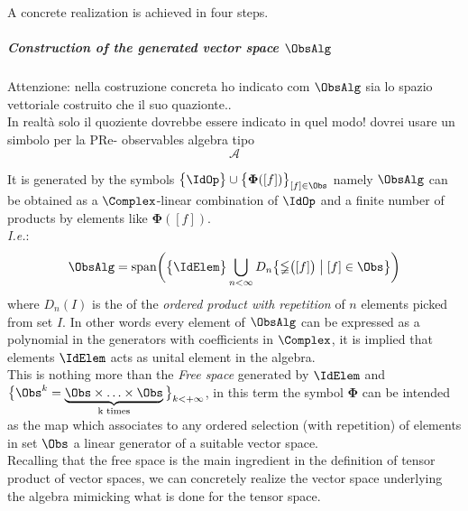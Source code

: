 \documentclass[Main]{subfiles}
\begin{document}
		A concrete realization is achieved in four steps.
			\subparagraph{Construction of the generated vector space $\ObsAlg$}
\ifToninus
		\begin{Warning}
			Attenzione: nella costruzione concreta ho indicato com $\ObsAlg$ sia lo spazio vettoriale costruito che il suo quazionte..
			\\
			In realtà solo il quoziente dovrebbe essere indicato in quel modo! dovrei usare un simbolo per la PRe- observables algebra tipo
			\begin{displaymath}
				\mathcal{A}
			\end{displaymath}
		\end{Warning}

\fi

   				It is generated
   				by the symbols $\big\{\IdOp\big\}\cup\big\{\mathbf{\Phi}([f])\big\}_{[f]\in \Obs}$ %
   				namely $\ObsAlg$ can be obtained as a $\Complex$-linear combination of $\IdOp$ and a finite number of products by elements like $\mathbf{\Phi}([f])$.\\
   				\textit{I.e.}:
   				\begin{displaymath}
   					\ObsAlg = \textrm{span} \biggr( \big\{\IdElem\big\}\bigcup_{n<\infty}D_n
   					\big\{\mathbb{\Phi}\big( [f]\big) \; \big\vert \;  [f] \in \Obs \big\}
   					\biggr)
   				\end{displaymath}
				where $D_n (I)$ is the of the \emph{ordered product with repetition}  of $n$ elements picked from set $I$.
   				In other words every element of $\ObsAlg$ can be expressed as a polynomial in the generators with coefficients in $\Complex$, it is implied that elements $\IdElem$ acts as unital element in the algebra.
   				\\
				This is nothing more than the \emph{Free space} generated by $\IdElem$ and $\big\{\Obs^k =
   				\underbrace{\Obs\times \ldots \times \Obs}_{\textrm{k times}} \big\}_{k< + \infty}$, in this term the symbol $\mathbf{\Phi}$ can be intended as the map which associates to any %
   				ordered selection (with repetition)
   				of elements in set $\Obs$ a linear generator of a suitable vector space.
   				\\
   				Recalling that the free space is the main ingredient in the definition of tensor product of vector spaces, we can concretely realize the vector space underlying the algebra mimicking what is done for the tensor space.
\end{document}
